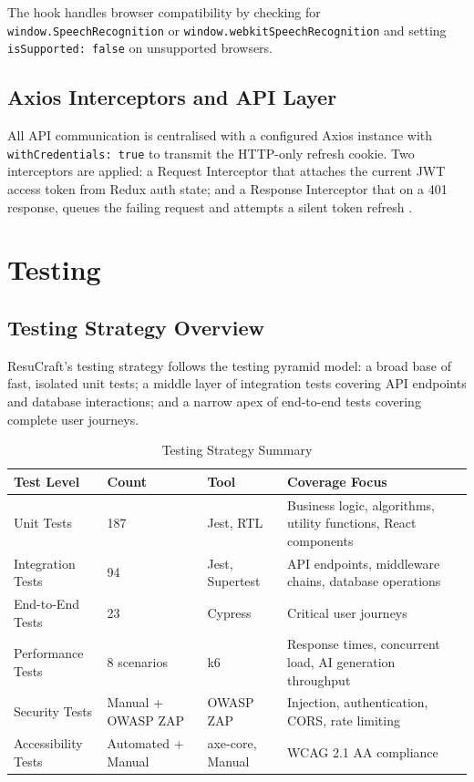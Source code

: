 \documentclass[12pt, a4paper, oneside]{report}
\begin{document}
The hook handles browser compatibility by checking for \texttt{window.SpeechRecognition} or \texttt{window.webkitSpeechRecognition} and setting \texttt{isSupported: false} on unsupported browsers.

\subsection{Axios Interceptors and API Layer}

All API communication is centralised with a configured Axios instance with \texttt{withCredentials: true} to transmit the HTTP-only refresh cookie. Two interceptors are applied: a Request Interceptor that attaches the current JWT access token from Redux auth state; and a Response Interceptor that on a 401 response, queues the failing request and attempts a silent token refresh \cite{jwt2015}.

\section{Testing}

\subsection{Testing Strategy Overview}

ResuCraft's testing strategy follows the testing pyramid model: a broad base of fast, isolated unit tests; a middle layer of integration tests covering API endpoints and database interactions; and a narrow apex of end-to-end tests \cite{cypress2024} covering complete user journeys.

\begin{table}[H]
\centering
\caption{Testing Strategy Summary}
\label{tab:testing_summary}
\renewcommand{\arraystretch}{1.4}
\begin{tabularx}{\textwidth}{|p{3cm}|p{2cm}|p{2.5cm}|X|}
\hline
\textbf{Test Level} & \textbf{Count} & \textbf{Tool} & \textbf{Coverage Focus} \\
\hline
Unit Tests & 187 & Jest, RTL & Business logic, algorithms, utility functions, React components \\
\hline
Integration Tests & 94 & Jest, Supertest & API endpoints, middleware chains, database operations \\
\hline
End-to-End Tests & 23 & Cypress \cite{cypress2024} & Critical user journeys \\
\hline
Performance Tests & 8 scenarios & k6 \cite{k62024} & Response times, concurrent load, AI generation throughput \\
\hline
Security Tests & Manual + OWASP ZAP & OWASP ZAP \cite{owasp2021} & Injection, authentication, CORS, rate limiting \\
\hline
Accessibility Tests & Automated + Manual & axe-core, Manual & WCAG 2.1 AA compliance \cite{wcag21} \\
\hline
\end{tabularx}
\end{table}
\end{document}
